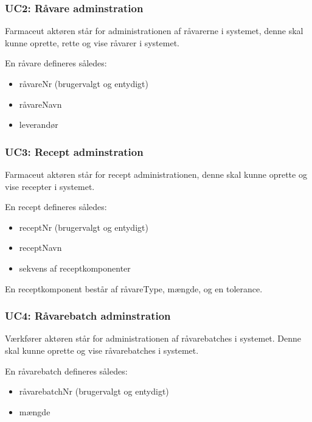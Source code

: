 \documentclass[a4paper]{article}
\begin{document}
\subsubsection{UC2: Råvare adminstration} %

Farmaceut aktøren står for administrationen af råvarerne i systemet, denne skal kunne oprette, rette og vise råvarer i systemet.

En råvare defineres således:

\begin{itemize}
  \item råvareNr (brugervalgt og entydigt)
  \item råvareNavn
  \item leverandør
\end{itemize}


\subsubsection{UC3: Recept adminstration} %

Farmaceut aktøren står for recept administrationen, denne skal kunne oprette og vise recepter i systemet.

En recept defineres således:
\begin{itemize}
  \item receptNr (brugervalgt og entydigt)
  \item receptNavn
  \item sekvens af receptkomponenter
\end{itemize}

En receptkomponent består af råvareType, mængde, og en tolerance.


\subsubsection{UC4: Råvarebatch adminstration} %

Værkfører aktøren står for administrationen af råvarebatches i systemet. Denne skal kunne oprette og vise råvarebatches i systemet. 

En råvarebatch defineres således:

\begin{itemize}
  \item råvarebatchNr (brugervalgt og entydigt)
  \item mængde
\end{itemize}
\end{document}
